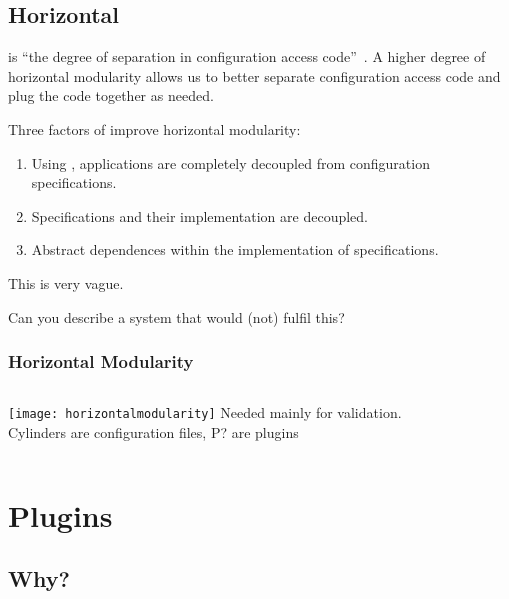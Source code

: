 \subsection{Horizontal}

\begin{frame}
	 is ``the degree of separation in configuration access code''~\cite{raab2016improving}. 
	A higher degree of horizontal modularity allows us to better separate configuration access code and plug the code together as needed.
\end{frame}

\begin{frame}
	Three factors of  improve horizontal modularity:
	\begin{enumerate}
	\item
	Using , applications are completely decoupled from configuration specifications.

	\item
	Specifications and their implementation are decoupled.

	\item
	Abstract dependences within the implementation of specifications.
	\end{enumerate}

	\begin{task}
	This is very vague.

	Can you describe a system that would (not) fulfil this?
	\end{task}
\end{frame}

\begin{frame}
	\frametitle{Horizontal Modularity}
	\begin{columns}[c]
	\column{7cm}
	\texttt{[image: horizontalmodularity]}
	\column{4cm}
	Needed mainly for validation. \\[1cm]

	Cylinders are configuration files, P? are plugins~\cite{raab2016improving}
	\end{columns}
\end{frame}


\section{Plugins}

\subsection{Why?}

